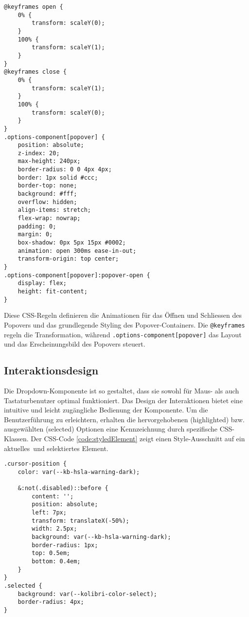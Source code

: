 \begin{lstlisting}[style = htmlcssjs, caption = CSS für das Popover-Element, label = code:popoverStyle]
@keyframes open {
    0% {
        transform: scaleY(0);
    }
    100% {
        transform: scaleY(1);
    }
}
@keyframes close {
    0% {
        transform: scaleY(1);
    }
    100% {
        transform: scaleY(0);
    }
}
.options-component[popover] {
    position: absolute;
    z-index: 20;
    max-height: 240px;
    border-radius: 0 0 4px 4px;
    border: 1px solid #ccc;
    border-top: none;
    background: #fff;
    overflow: hidden;
    align-items: stretch;
    flex-wrap: nowrap;
    padding: 0;
    margin: 0;
    box-shadow: 0px 5px 15px #0002;
    animation: open 300ms ease-in-out;
    transform-origin: top center;
}
.options-component[popover]:popover-open {
    display: flex;
    height: fit-content;
} 
\end{lstlisting}

Diese CSS-Regeln definieren die Animationen für das Öffnen und Schliessen des Popovers und das grundlegende Styling des Popover-Containers.
Die \texttt{@keyframes} regeln die Transformation, während \texttt{.options-component[popover]} das Layout und das Erscheinungsbild des Popovers steuert.


\subsection{Interaktionsdesign}
\label{sec:interactionDesign}

Die Dropdown-Komponente ist so gestaltet, dass sie sowohl für Maus- als auch Tastaturbenutzer optimal funktioniert. 
Das Design der Interaktionen bietet eine intuitive und leicht zugängliche Bedienung der Komponente.
Um die Benutzerführung zu erleichtern, erhalten die hervorgehobenen (highlighted) bzw. ausgewählten (selected) Optionen eine Kennzeichnung durch spezifische CSS-Klassen.
Der CSS-Code \ref{code:styledElement} zeigt einen Style-Ausschnitt auf ein aktuelles\footnotemark \ und selektiertes Element.

\begin{lstlisting}[style = htmlcssjs, caption = Aktuelle (\texttt{cursor-position}) und ausgewählte (\texttt{selected}) Option, label = code:styledElement]
.cursor-position {
    color: var(--kb-hsla-warning-dark);

    &:not(.disabled)::before {
        content: '';
        position: absolute;
        left: 7px;
        transform: translateX(-50%);
        width: 2.5px;
        background: var(--kb-hsla-warning-dark);
        border-radius: 1px;
        top: 0.5em;
        bottom: 0.4em;
    }
}
.selected {
    background: var(--kolibri-color-select);
    border-radius: 4px;
}
\end{lstlisting}


